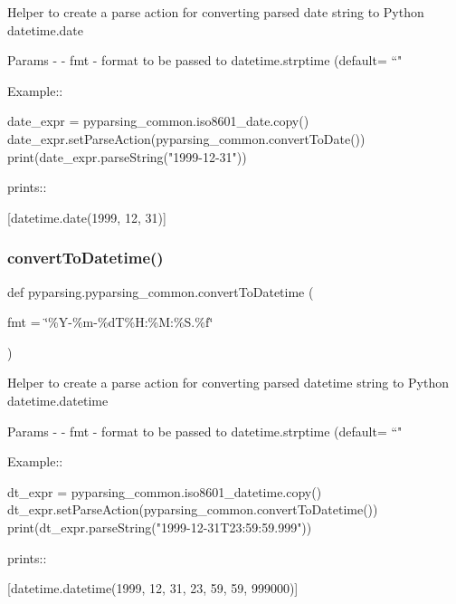 \begin{DoxyVerb}Helper to create a parse action for converting parsed date string to Python datetime.date

Params -
 - fmt - format to be passed to datetime.strptime (default= ``"%

Example::

    date_expr = pyparsing_common.iso8601_date.copy()
    date_expr.setParseAction(pyparsing_common.convertToDate())
    print(date_expr.parseString("1999-12-31"))

prints::

    [datetime.date(1999, 12, 31)]
\end{DoxyVerb}
 \mbox{\label{classpyparsing_1_1pyparsing__common_a59db5bf6d5234beeb9c76760bc81a106}} 
\subsubsection{\texorpdfstring{convert\+To\+Datetime()}{convertToDatetime()}}
{\footnotesize\ttfamily def pyparsing.\+pyparsing\+\_\+common.\+convert\+To\+Datetime (\begin{DoxyParamCaption}\item[{}]{fmt = {\ttfamily \char`\"{}\%Y-\/\%m-\/\%dT\%H\+:\%M\+:\%S.\%f\char`\"{}} }\end{DoxyParamCaption})\hspace{0.3cm}{\ttfamily [static]}}

\begin{DoxyVerb}Helper to create a parse action for converting parsed
datetime string to Python datetime.datetime

Params -
 - fmt - format to be passed to datetime.strptime (default= ``"%

Example::

    dt_expr = pyparsing_common.iso8601_datetime.copy()
    dt_expr.setParseAction(pyparsing_common.convertToDatetime())
    print(dt_expr.parseString("1999-12-31T23:59:59.999"))

prints::

    [datetime.datetime(1999, 12, 31, 23, 59, 59, 999000)]
\end{DoxyVerb}
 \mbox{\label{classpyparsing_1_1pyparsing__common_a46040ee63bdee362b047413db21def05}} 
